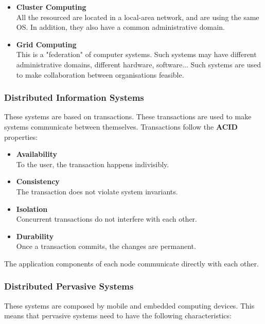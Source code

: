\documentclass{article}
\begin{document}
\begin{itemize}
	\item \textbf{Cluster Computing} \\
	All the resourced are located in a local-area network, and are using the same OS. In addition, they also have a common administrative domain.
	
	\item \textbf{Grid Computing} \\
	This is a "federation" of computer systems. Such systems may have different administrative domains, different hardware, software... Such systems are used to make collaboration between organisations feasible.
\end{itemize}

\subsubsection{Distributed Information Systems}
These systems are based on transactions. These transactions are used to make systems communicate between themselves. Transactions follow the \textbf{ACID} properties:

\begin{itemize}
	\item \textbf{Availability} \\
	To the user, the transaction happens indivisibly.
	
	\item \textbf{Consistency} \\
	The transaction does not violate system invariants.
	
	\item \textbf{Isolation} \\
	Concurrent transactions do not interfere with each other.
	
	\item \textbf{Durability} \\
	Once a transaction commits, the changes are permanent.
\end{itemize}

\noindent The application components of each node communicate directly with each other.

\subsubsection{Distributed Pervasive Systems}
These systems are composed by mobile and embedded computing devices. This means that pervasive systems need to have the following characteristics:
\end{document}
